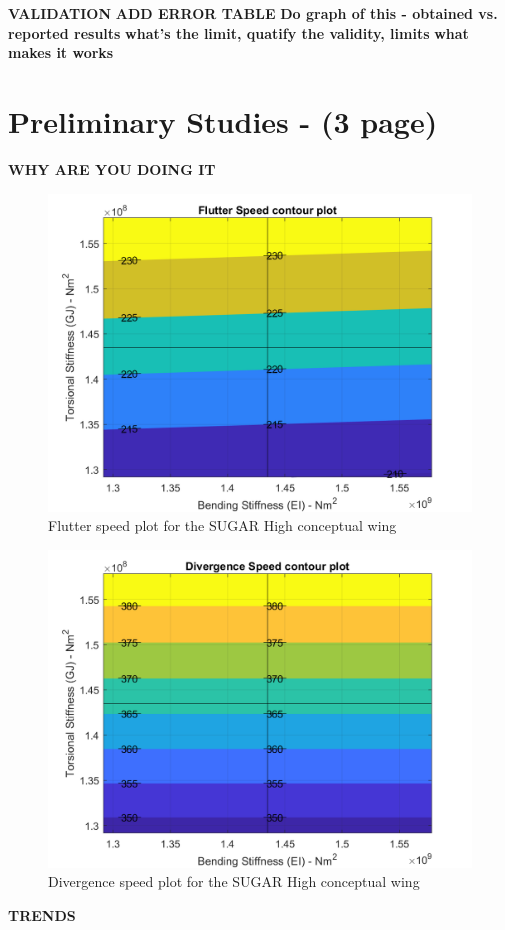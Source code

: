 \documentclass[11pt]{article}
\begin{document}
\textbf{VALIDATION}
\textbf{ADD ERROR TABLE}
\textbf{Do graph of this - obtained vs. reported results}
\textbf{what's the limit, quatify the validity, limits}
\textbf{what makes it works}
\cleardoublepage

\section{Preliminary Studies - (3 page)}
\textbf{WHY ARE YOU DOING IT}
\begin{figure}[H]
    \centering
    \includegraphics[width = .7\textwidth]{figures/SUGAR_flutter.png}
    \caption{Flutter speed plot for the SUGAR High conceptual wing}
    \label{fig:SUGAR-flutter}
\end{figure}

\begin{figure}[H]
    \centering
    \includegraphics[width = .7\textwidth]{figures/SUGAR_divergence.png}
    \caption{Divergence speed plot for the SUGAR High conceptual wing}
    \label{fig:SUGAR-divergence}
\end{figure}

\textbf{TRENDS}
\end{document}
